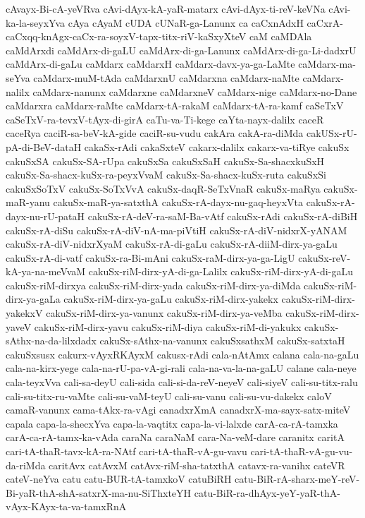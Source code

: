 {cAvayx-Bi-cA-yeVRva
cAvi-dAyx-kA-yaR-matarx
cAvi-dAyx-ti-reV-keVNa
cAvi-ka-la-seyxYva
cAya
cAyaM
cUDA
cUNaR-ga-Lanunx
ca
caCxnAdxH
caCxrA-caCxqq-knAgx-caCx-ra-soyxV-tapx-titx-riV-kaSxyXteV
caM
caMDAla
caMdArxdi
caMdArx-di-gaLU
caMdArx-di-ga-Lanunx
caMdArx-di-ga-Li-dadxrU
caMdArx-di-gaLu
caMdarx
caMdarxH
caMdarx-davx-ya-ga-LaMte
caMdarx-ma-seYva
caMdarx-muM-tAda
caMdarxnU
caMdarxna
caMdarx-naMte
caMdarx-nalilx
caMdarx-nanunx
caMdarxne
caMdarxneV
caMdarx-nige
caMdarx-no-Dane
caMdarxra
caMdarx-raMte
caMdarx-tA-rakaM
caMdarx-tA-ra-kamf
caSeTxV
caSeTxV-ra-tevxV-tAyx-di-girA
caTu-va-Ti-kege
caYta-nayx-dalilx
caceR
caceRya
caciR-sa-beV-kA-gide
caciR-su-vudu
cakAra
cakA-ra-diMda
cakUSx-rU-pA-di-BeV-dataH
cakaSx-rAdi
cakaSxteV
cakarx-dalilx
cakarx-va-tiRye
cakuSx
cakuSxSA
cakuSx-SA-rUpa
cakuSxSa
cakuSxSaH
cakuSx-Sa-shacxkuSxH
cakuSx-Sa-shacx-kuSx-ra-peyxVvaM
cakuSx-Sa-shacx-kuSx-ruta
cakuSxSi
cakuSxSoTxV
cakuSx-SoTxVvA
cakuSx-daqR-SeTxVnaR
cakuSx-maRya
cakuSx-maR-yanu
cakuSx-maR-ya-satxthA
cakuSx-rA-dayx-nu-gaq-heyxVta
cakuSx-rA-dayx-nu-rU-pataH
cakuSx-rA-deV-ra-saM-Ba-vAtf
cakuSx-rAdi
cakuSx-rA-diBiH
cakuSx-rA-diSu
cakuSx-rA-diV-nA-ma-piVtiH
cakuSx-rA-diV-nidxrX-yANAM
cakuSx-rA-diV-nidxrXyaM
cakuSx-rA-di-gaLu
cakuSx-rA-diiM-dirx-ya-gaLu
cakuSx-rA-di-vatf
cakuSx-ra-Bi-mAni
cakuSx-raM-dirx-ya-ga-LigU
cakuSx-reV-kA-ya-na-meVvaM
cakuSx-riM-dirx-yA-di-ga-Lalilx
cakuSx-riM-dirx-yA-di-gaLu
cakuSx-riM-dirxya
cakuSx-riM-dirx-yada
cakuSx-riM-dirx-ya-diMda
cakuSx-riM-dirx-ya-gaLa
cakuSx-riM-dirx-ya-gaLu
cakuSx-riM-dirx-yakekx
cakuSx-riM-dirx-yakekxV
cakuSx-riM-dirx-ya-vanunx
cakuSx-riM-dirx-ya-veMba
cakuSx-riM-dirx-yaveV
cakuSx-riM-dirx-yavu
cakuSx-riM-diya
cakuSx-riM-di-yakukx
cakuSx-sAthx-na-da-lilxdadx
cakuSx-sAthx-na-vanunx
cakuSxsathxM
cakuSx-satxtaH
cakuSxsusx
cakurx-vAyxRKAyxM
cakusx-rAdi
cala-nAtAmx
calana
cala-na-gaLu
cala-na-kirx-yege
cala-na-rU-pa-vA-gi-rali
cala-na-va-la-na-gaLU
calane
cala-neye
cala-teyxVva
cali-sa-deyU
cali-sida
cali-si-da-reV-neyeV
cali-siyeV
cali-su-titx-ralu
cali-su-titx-ru-vaMte
cali-su-vaM-teyU
cali-su-vanu
cali-su-vu-dakekx
caloV
camaR-vanunx
cama-tAkx-ra-vAgi
canadxrXmA
canadxrX-ma-sayx-satx-miteV
capala
capa-la-shecxYva
capa-la-vaqtitx
capa-la-vi-lalxde
carA-ca-rA-tamxka
carA-ca-rA-tamx-ka-vAda
caraNa
caraNaM
cara-Na-veM-dare
caranitx
caritA
cari-tA-thaR-tavx-kA-ra-NAtf
cari-tA-thaR-vA-gu-vavu
cari-tA-thaR-vA-gu-vu-da-riMda
caritAvx
catAvxM
catAvx-riM-sha-tatxthA
catavx-ra-vanihx
cateVR
cateV-neYva
catu
catu-BUR-tA-tamxkoV
catuBiRH
catu-BiR-rA-sharx-meY-reV-Bi-yaR-thA-shA-satxrX-ma-nu-SiThxteYH
catu-BiR-ra-dhAyx-yeY-yaR-thA-vAyx-KAyx-ta-va-tamxRnA
}

